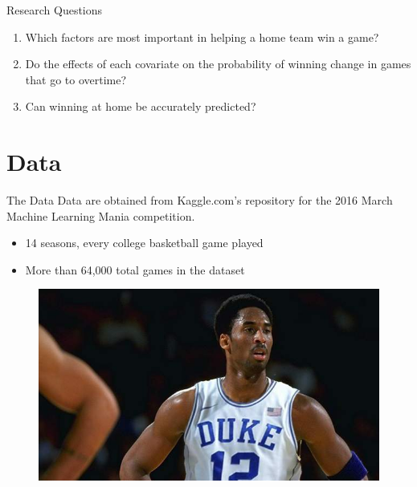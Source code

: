 \documentclass{beamer}
\begin{document}
\begin{frame}{Research Questions}
\begin{enumerate}
	\item %
	Which factors are most important in helping a home team win a game?
	\item %
	Do the effects of each covariate on the probability of winning change in games that go to overtime?
	\item %
	Can winning at home be accurately predicted?
\end{enumerate}
	
\end{frame}

	
\section{Data}
\begin{frame}{The Data}
	Data are obtained from Kaggle.com's repository for the 2016 March Machine Learning Mania competition. %
		\\
		\begin{itemize}
			\item 14 seasons, every college basketball game played
			\item More than 64,000 total games in the dataset  
						
		\end{itemize}
	
	\begin{figure}
		\includegraphics[width = 200 pt]{fakekobe.jpg}
	\end{figure}
	
\end{frame}
\end{document}
